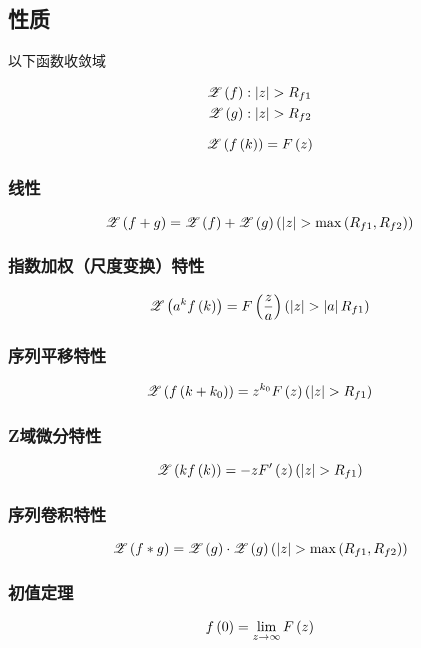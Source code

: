 \documentclass{article}
\begin{document}
\subsection{性质}

以下函数收敛域

\[\begin{aligned}
        \ztrans{f} & :\abs{z}>R_{f1} \\
        \ztrans{g} & :\abs{z}>R_{f2}
    \end{aligned}\]

\[\mathscr Z\left(f\left(k\right)\right)=F\left(z\right)\]

\subsubsection{线性}

\[\ztrans{f+g}=\ztrans{f}+\ztrans{g}\pare{\abs{z}>\max\pare{{R_{f1},R_{f2}}}}\]

\subsubsection{指数加权（尺度变换）特性}

\[\ztrans{a^k\fk}=F\pare{\frac za}\pare{\abs z>\abs aR_{f1}}\]

\subsubsection{序列平移特性}

\[\ztrans{f\pare{k+k_0}}=z^{k_0}\fz\pare{\abs{z}>R_{f1}}\]

\subsubsection{Z域微分特性}

\[\ztrans{k\fk}=-zF^\prime\pare{z}\pare{\abs{z}>R_{f1}}\]

\subsubsection{序列卷积特性}

\[\ztrans{f\ast g}=\ztrans{g}\cdot\ztrans{g}\pare{\abs{z}>\max\pare{{R_{f1},R_{f2}}}}\]

\subsubsection{初值定理}

\[f\left(0\right)=\lim_{z\to\infty}F\left(z\right)\]
\end{document}

